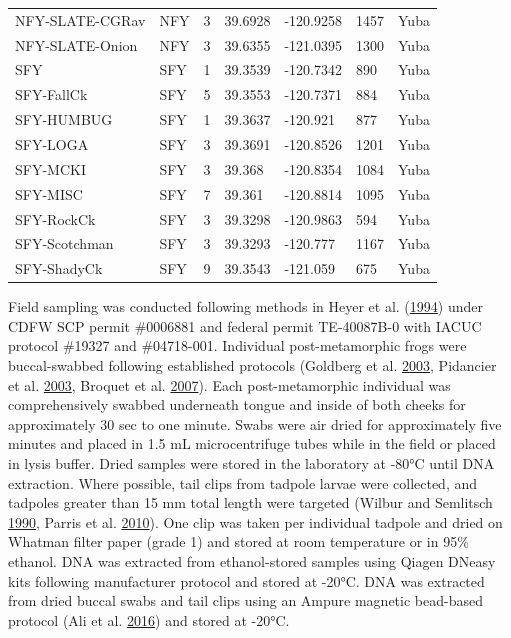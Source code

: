 \documentclass[proquest,12pt,final]{ucthesis-CA2012} %
\begin{document}
\begin{ucmainmatter}
\begin{longtable}[t]{llrllll}
\addlinespace
NFY-SLATE-CGRav & NFY & 3 & 39.6928 & -120.9258 & 1457 & Yuba\\
NFY-SLATE-Onion & NFY & 3 & 39.6355 & -121.0395 & 1300 & Yuba\\
SFY & SFY & 1 & 39.3539 & -120.7342 & 890 & Yuba\\
SFY-FallCk & SFY & 5 & 39.3553 & -120.7371 & 884 & Yuba\\
SFY-HUMBUG & SFY & 1 & 39.3637 & -120.921 & 877 & Yuba\\
\addlinespace
SFY-LOGA & SFY & 3 & 39.3691 & -120.8526 & 1201 & Yuba\\
SFY-MCKI & SFY & 3 & 39.368 & -120.8354 & 1084 & Yuba\\
SFY-MISC & SFY & 7 & 39.361 & -120.8814 & 1095 & Yuba\\
SFY-RockCk & SFY & 3 & 39.3298 & -120.9863 & 594 & Yuba\\
SFY-Scotchman & SFY & 3 & 39.3293 & -120.777 & 1167 & Yuba\\
SFY-ShadyCk & SFY & 9 & 39.3543 & -121.059 & 675 & Yuba\\*
\end{longtable}\endgroup{}
\clearpage

Field sampling was conducted following methods in Heyer et al.
(\protect\hyperlink{ref-heyer_measuring_1994}{1994}) under CDFW SCP
permit \#0006881 and federal permit TE-40087B-0 with IACUC protocol
\#19327 and \#04718-001. Individual post-metamorphic frogs were
buccal-swabbed following established protocols (Goldberg et al.
\protect\hyperlink{ref-goldberg_frogs_2003}{2003}, Pidancier et al.
\protect\hyperlink{ref-pidancier_buccal_2003}{2003}, Broquet et al.
\protect\hyperlink{ref-broquet_buccal_2007}{2007}). Each
post-metamorphic individual was comprehensively swabbed underneath
tongue and inside of both cheeks for approximately 30 sec to one minute.
Swabs were air dried for approximately five minutes and placed in 1.5 mL
microcentrifuge tubes while in the field or placed in lysis buffer.
Dried samples were stored in the laboratory at -80°C until DNA
extraction. Where possible, tail clips from tadpole larvae were
collected, and tadpoles greater than 15 mm total length were targeted
(Wilbur and Semlitsch
\protect\hyperlink{ref-wilbur_ecological_1990}{1990}, Parris et al.
\protect\hyperlink{ref-parris_assessing_2010}{2010}). One clip was taken
per individual tadpole and dried on Whatman filter paper (grade 1) and
stored at room temperature or in 95\% ethanol. DNA was extracted from
ethanol-stored samples using Qiagen DNeasy kits following manufacturer
protocol and stored at -20°C. DNA was extracted from dried buccal swabs
and tail clips using an Ampure magnetic bead-based protocol (Ali et al.
\protect\hyperlink{ref-ali_rad_2016}{2016}) and stored at -20°C.


\end{ucmainmatter}
\end{document}
